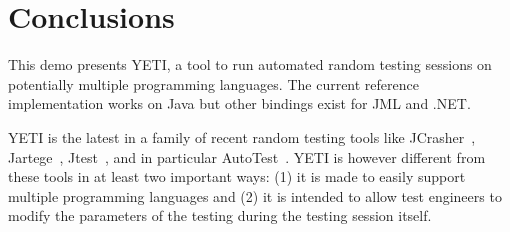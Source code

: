 \section{Conclusions}\label{sec:conc}
This demo presents YETI, a tool to run automated random testing 
sessions on potentially multiple programming languages. The current  reference 
implementation works on Java but other bindings exist for JML and 
.NET. 

YETI is the latest in a family of recent random testing tools like
JCrasher~\cite{Csallner2004}, Jartege~\cite{Oriat2004}, Jtest~\cite{Jtest}, and in particular 
AutoTest~\cite{Ciupa2007}. YETI is however 
different from these tools in at least two important ways: (1) it is made to 
easily support multiple programming languages and (2) 
it is intended to allow test engineers to modify the parameters of the 
testing during the testing session itself.
